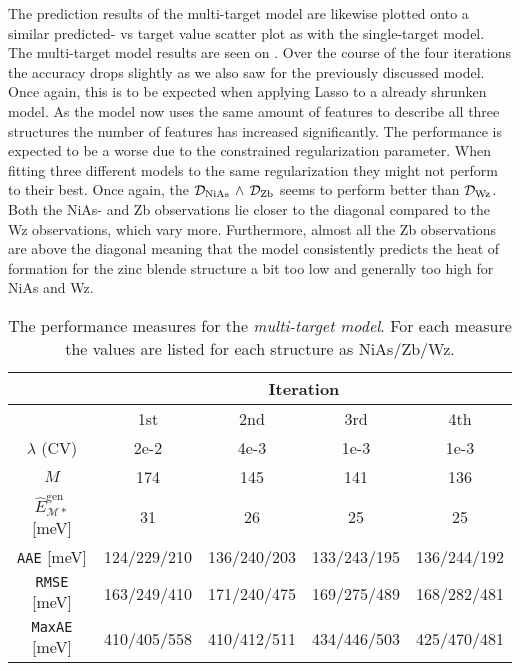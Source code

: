 The prediction results of the multi-target model are likewise plotted onto a similar predicted- vs target value scatter plot as with the single-target model. The multi-target model results are seen on . Over the course of the four iterations the accuracy drops slightly as we also saw for the previously discussed model. Once again, this is to be expected when applying Lasso to a already shrunken model. As the model now uses the same amount of features to describe all three structures the number of features has increased significantly. The performance is expected to be a worse due to the constrained regularization parameter. When fitting three different models to the same regularization they might not perform to their best. Once again, the $\mathcal{D}_{\mathrm{NiAs}} \, \wedge \, \mathcal{D}_{\mathrm{Zb}}$ seems to perform better than $\mathcal{D}_{\mathrm{Wz}}$. Both the NiAs- and Zb observations lie closer to the diagonal compared to the Wz observations, which vary more. Furthermore, almost all the Zb observations are above the diagonal meaning that the model consistently predicts the heat of formation for the zinc blende structure a bit too low and generally too high for NiAs and Wz. 

\begin{table}[ht]
\centering
\begin{tabular}{c|cccc}
\toprule
 & \multicolumn{4}{c}{\textbf{Iteration}} \\
\hline
     & 1st & 2nd & 3rd & 4th  \\
   
   \midrule
   \hline
 
  $\lambda$ (CV) & 2e-2 & 4e-3 & 1e-3 & 1e-3 \\
    $M$  & 174 & 145 & 141 & 136 \\
   $\hat{E}_{\mathcal{M}*}^{\mathrm{gen}}$ [meV] & 31 & 26 & 25 & 25 \\
   \texttt{AAE} [meV] & 124/229/210 & 136/240/203 & 133/243/195 & 136/244/192          \\
   \texttt{RMSE} [meV] & 163/249/410 & 171/240/475 & 169/275/489 & 168/282/481        \\
   \texttt{MaxAE} [meV] & 410/405/558 & 410/412/511 & 434/446/503 & 425/470/481        \\
    \hline
\bottomrule
   
\end{tabular}
\caption[Table of the different statistical measures calculated for the multi-target model]{The performance measures for the \emph{multi-target model}. For each measure the values are listed for each structure as NiAs/Zb/Wz.}
\label{tab:table_results_multi}
\end{table}




